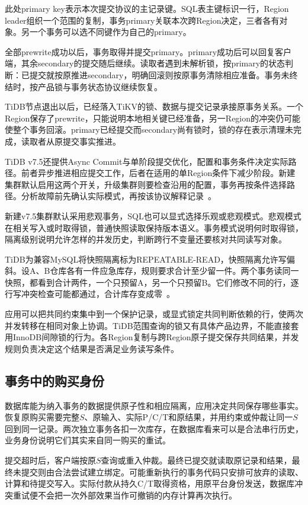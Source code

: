 此处primary key表示本次提交协议的主记录键。SQL表主键标识一行，Region leader组织一个范围的复制，事务primary关联本次跨Region决定，三者各有对象。另一个事务可以选不同键作为自己的primary。


全部prewrite成功以后，事务取得并提交primary。primary成功后可以回复客户端，其余secondary的提交随后继续。读取者遇到未解析锁，按primary的状态判断：已提交就按原推进secondary，明确回滚则按原事务清除相应准备。事务未终结时，按产品锁与事务状态协议继续恢复。


TiDB节点退出以后，已经落入TiKV的锁、数据与提交记录承接原事务关系。一个Region保存了prewrite，只能说明本地相关键已经准备，另一Region的冲突仍可能使整个事务回滚。primary已经提交而secondary尚有锁时，锁的存在表示清理未完成，读取者从原提交事实推进。

TiDB v7.5还提供Async Commit与单阶段提交优化，配置和事务条件决定实际路径。前者异步推进相应提交工作，后者在适用的单Region条件下减少阶段。新建集群默认启用这两个开关，升级集群则要检查沿用的配置，事务再按条件选择路径。分析故障前先确认实际模式，再按该协议解释记录~\cite{tidb75-commit}。

新建v7.5集群默认采用悲观事务，SQL也可以显式选择乐观或悲观模式。悲观模式在相关写入或时取得锁，普通快照读取保持版本语义。事务模式说明何时取得锁，隔离级别说明允许怎样的并发历史，判断跨行不变量还要核对共同读写对象。

TiDB为兼容MySQL将快照隔离标为REPEATABLE-READ，快照隔离允许写偏斜。设A、B仓库各有一件应急库存，规则要求合计至少留一件。两个事务读同一快照，都看到合计两件，一个只预留A，另一个只预留B。它们修改不同的行，逐行写冲突检查可能都通过，合计库存变成零~\cite{tikv-75-transactions}。


应用可以把共同约束集中到一个保护记录，或显式锁定共同判断依赖的行，使两次并发转移在相同对象上协调。TiDB范围查询的锁又有具体产品边界，不能直接套用InnoDB间隙锁的行为。各Region复制与跨Region原子提交保存共同结果，并发规则负责决定这个结果是否满足业务读写条件。

\subsection{事务中的购买身份}

数据库能为纳入事务的数据提供原子性和相应隔离，应用决定共同保存哪些事实。恢复原购买需要完整$S$、原输入、实际P/C/T和原结果，并用约束或仲裁让同一$S$回到同一记录。两次独立事务各扣一次库存，在数据库看来可以是合法串行历史，业务身份说明它们其实来自同一购买的重试。

提交超时后，客户端按原$S$查询或重入仲裁。最终已提交就读取原记录和结果，最终未提交则由合法尝试建立绑定。可能重新执行的事务代码只安排可放弃的读取、计算和待提交写入。实际付款从持久C/T取得资格，用原平台身份发送，数据库冲突重试便不会把一次外部效果当作可撤销的内存计算再次执行。
\FloatBarrier
